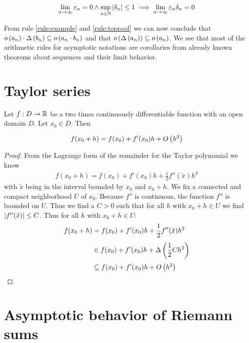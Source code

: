 \begin{align}
  \lim_{n\to\infty} \varepsilon_n = 0 \land \sup_{n\in\mathbb N} \left|{\delta_n}\right| \le 1 \implies \lim_{n\to\infty} \varepsilon_n \delta_n = 0
\end{align}

From rule \ref{rule:example} and \ref{rule:toproof} we can now conclude that $o\left( {a_n} \right) \cdot \Delta\left( {b_n} \right) \subseteq o\left( {a_n \cdot b_n} \right)$ and that $o\left( {\Delta\left( {a_n} \right)} \right) \subseteq o\left( {a_n} \right)$. We see that most of the arithmetic rules for asymptotic notations are corollaries from already known theorems about sequences and their limit behavior.

\section{Taylor series}

\begin{theorem}
  Let $f:D\to\mathbb R$ be a two times continuously differentiable function with an open domain $D$. Let $x_0\in D$. Then

  \begin{align}
    f(x_0+h) = f(x_0) + f'(x_0) h + O\left( {h^2} \right)
  \end{align}
\end{theorem}

\begin{proof}
  From the Lagrange form of the remainder for the Taylor polynomial we know \cite[p. 284]{koenigsberger}
  \begin{align}
    f(x_0+h)=f(x_0)+f'(x_0)h + \frac 12 f''(\tilde x) h^2
  \end{align}
  with $\tilde x$ being in the interval bounded by $x_0$ and $x_0+h$. We fix a connected and compact neighborhood $U$ of $x_0$. Because $f''$ is continuous, the function $f''$ is bounded on $U$. Thus we find a $C > 0$ such that for all $h$ with $x_0+h\in U$ we find $\left|{f''(\tilde x)}\right| \le C$. Thus for all $h$ with $x_0+h\in U$:
  \begin{align}
    f(x_0+h)& =f(x_0)+f'(x_0)h + \frac 12 f''(\tilde x) h^2 \nl
    & \in f(x_0)+f'(x_0)h + \bigabs{\frac 12 C h^2} \nl
    & \subseteq f(x_0)+f'(x_0)h + \bigo{h^2}
  \end{align}
\end{proof}

\section{Asymptotic behavior of Riemann sums}

